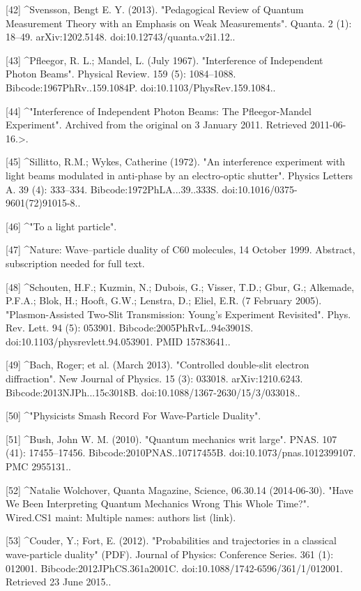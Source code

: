 [42]
^Svensson, Bengt E. Y. (2013). "Pedagogical Review of Quantum Measurement Theory with an Emphasis on Weak Measurements". Quanta. 2 (1): 18–49. arXiv:1202.5148. doi:10.12743/quanta.v2i1.12..

[43]
^Pfleegor, R. L.; Mandel, L. (July 1967). "Interference of Independent Photon Beams". Physical Review. 159 (5): 1084–1088. Bibcode:1967PhRv..159.1084P. doi:10.1103/PhysRev.159.1084..

[44]
^"Interference of Independent Photon Beams: The Pfleegor-Mandel Experiment". Archived from the original on 3 January 2011. Retrieved 2011-06-16.>.

[45]
^Sillitto, R.M.; Wykes, Catherine (1972). "An interference experiment with light beams modulated in anti-phase by an electro-optic shutter". Physics Letters A. 39 (4): 333–334. Bibcode:1972PhLA...39..333S. doi:10.1016/0375-9601(72)91015-8..

[46]
^"To a light particle".

[47]
^Nature: Wave–particle duality of C60 molecules, 14 October 1999. Abstract, subscription needed for full text.

[48]
^Schouten, H.F.; Kuzmin, N.; Dubois, G.; Visser, T.D.; Gbur, G.; Alkemade, P.F.A.; Blok, H.; Hooft, G.W.; Lenstra, D.; Eliel, E.R. (7 February 2005). "Plasmon-Assisted Two-Slit Transmission: Young's Experiment Revisited". Phys. Rev. Lett. 94 (5): 053901. Bibcode:2005PhRvL..94e3901S. doi:10.1103/physrevlett.94.053901. PMID 15783641..

[49]
^Bach, Roger; et al. (March 2013). "Controlled double-slit electron diffraction". New Journal of Physics. 15 (3): 033018. arXiv:1210.6243. Bibcode:2013NJPh...15c3018B. doi:10.1088/1367-2630/15/3/033018..

[50]
^"Physicists Smash Record For Wave-Particle Duality".

[51]
^Bush, John W. M. (2010). "Quantum mechanics writ large". PNAS. 107 (41): 17455–17456. Bibcode:2010PNAS..10717455B. doi:10.1073/pnas.1012399107. PMC 2955131..

[52]
^Natalie Wolchover, Quanta Magazine, Science, 06.30.14 (2014-06-30). "Have We Been Interpreting Quantum Mechanics Wrong This Whole Time?". Wired.CS1 maint: Multiple names: authors list (link).

[53]
^Couder, Y.; Fort, E. (2012). "Probabilities and trajectories in a classical wave-particle duality" (PDF). Journal of Physics: Conference Series. 361 (1): 012001. Bibcode:2012JPhCS.361a2001C. doi:10.1088/1742-6596/361/1/012001. Retrieved 23 June 2015..

